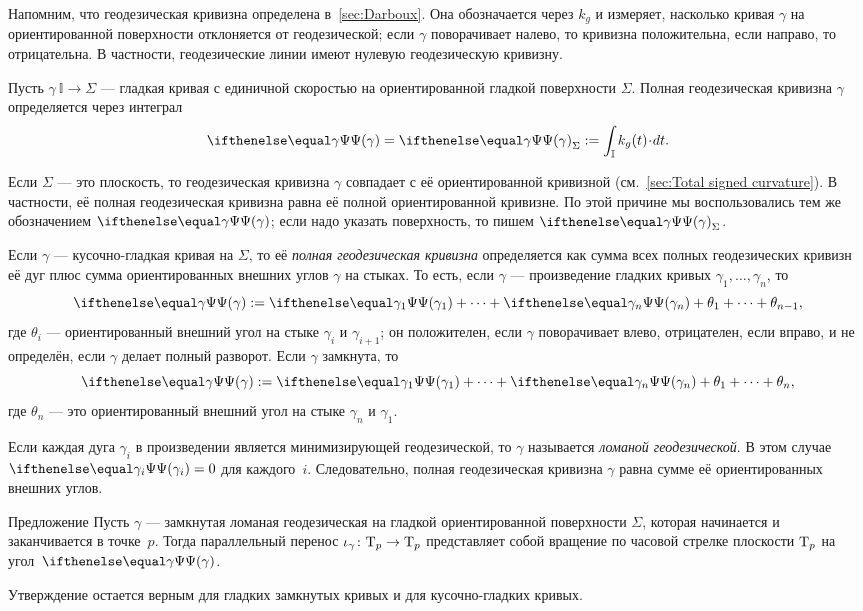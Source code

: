 Напомним, что геодезическая кривизна определена в~\ref{sec:Darboux}.
Она обозначается через $k_g$ и измеряет, насколько кривая $\gamma$ на ориентированной поверхности отклоняется от геодезической;
если $\gamma$ поворачивает налево, то кривизна положительна, если направо, то отрицательна.
В частности, геодезические линии имеют нулевую геодезическую кривизну.

Пусть $\gamma\:\mathbb{I}\to \Sigma$ --- гладкая кривая с единичной скоростью на ориентированной гладкой поверхности $\Sigma$.
Полная геодезическая кривизна $\gamma$ определяется через интеграл 
\[\tgc\gamma=\tgc\gamma_\Sigma
\df
\int_{\mathbb{I}} k_g(t)\cdot dt.\]

Если $\Sigma$ --- это плоскость, то геодезическая кривизна $\gamma$ совпадает
с её ориентированной кривизной (см.~\ref{sec:Total signed curvature}).
В частности, её полная геодезическая кривизна равна её полной ориентированной кривизне.
По этой причине мы воспользовались тем же обозначением $\tgc\gamma$; если надо указать поверхность, то пишем $\tgc\gamma_\Sigma$.

Если $\gamma$ --- кусочно-гладкая кривая на $\Sigma$, то её \emph{полная геодезическая кривизна} определяется как сумма всех полных геодезических кривизн её дуг плюс сумма ориентированных внешних углов $\gamma$ на стыках.
То есть, если $\gamma$ --- произведение гладких кривых $\gamma_1,\dots,\gamma_n$, то
\[\tgc\gamma
\df
\tgc{\gamma_1}+\dots+\tgc{\gamma_n}+\theta_1+\dots+\theta_{n-1},\]
где $\theta_i$ --- ориентированный внешний угол на стыке $\gamma_i$ и $\gamma_{i+1}$;
он положителен, если $\gamma$ поворачивает влево, отрицателен, если вправо, и не определён, если $\gamma$ делает полный разворот.
Если $\gamma$ замкнута, то 
\[\tgc\gamma
\df
\tgc{\gamma_1}+\dots+\tgc{\gamma_n}+\theta_1+\dots+\theta_n,\]
где $\theta_n$ --- это ориентированный внешний угол на стыке $\gamma_n$ и $\gamma_1$.

Если каждая дуга $\gamma_i$ в произведении является минимизирующей геодезической, то $\gamma$ называется \emph{ломаной геодезической}.
В этом случае $\tgc{\gamma_i}=0$ для каждого~$i$.
Следовательно, полная геодезическая кривизна $\gamma$ равна сумме её ориентированных внешних углов.

\begin{thm}{Предложение}\label{prop:pt+tgc}
Пусть $\gamma$ --- замкнутая ломаная геодезическая на гладкой ориентированной поверхности $\Sigma$, которая начинается и заканчивается в точке~$p$.
Тогда параллельный перенос $\iota_\gamma\colon\mathrm{T}_p\to\mathrm{T}_p$ представляет собой вращение по часовой стрелке плоскости $\mathrm{T}_p$ на угол~$\tgc\gamma$.

Утверждение остается верным для гладких замкнутых кривых и для кусочно-гладких кривых.
\end{thm}

